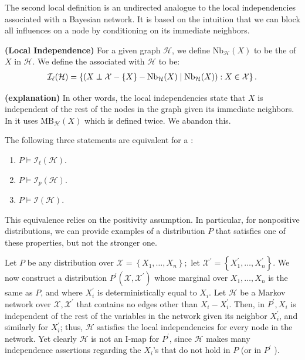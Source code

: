 \documentclass{article}
\newcommand{\bfs}[1]{\textbf{({#1}) }}
\begin{document}
The second local definition is an undirected analogue to the local independencies associated with a Bayesian network. It is based on the intuition that we can block all influences on a node by conditioning on its immediate neighbors.
\begin{defa}\bfs{Local Independence}
For a given graph $\mathcal{H}$, we define  $\mathrm{Nb}_{\mathcal{H}}(X)$ to be the  of $X$ in $\mathcal{H}$. We define the  associated with $\mathcal{H}$ to be:
\begin{align*}
\mathcal{I}_{\ell}(\mathcal{H})=\left\{\left(X \perp \mathcal{X}-\{X\}-\mathrm{Nb}_{\mathcal{H}}(X) \mid \mathrm{Nb}_{\mathcal{H}}(X)\right): X \in \mathcal{X}\right\} .
\end{align*}
\end{defa}
\begin{rema}\bfs{explanation}
In other words, the local independencies state that $X$ is independent of the rest of the nodes in the graph given its immediate neighbors. In \cite{koller2009probabilistic} it uses $\mathrm{MB}_{\mathcal{H}}(X)$ which is defined twice. We abandon this.
\end{rema}
\begin{thma}
The following three statements are equivalent for a :
\begin{enumerate}
    \item  $P \models \mathcal{I}_{\ell}(\mathcal{H})$.
    \item $P \models \mathcal{I}_{p}(\mathcal{H})$.
    \item $P \models \mathcal{I}(\mathcal{H})$.
\end{enumerate}
\end{thma}
This equivalence relies on the positivity assumption. In particular, for nonpositive distributions, we can provide examples of a distribution $P$ that satisfies one of these properties, but not the stronger one.
\begin{exma}
Let $P$ be any distribution over $\mathcal{X}=\left\{X_{1}, \ldots, X_{n}\right\} ;$ let $\mathcal{X}^{\prime}=\left\{X_{1}^{\prime}, \ldots, X_{n}^{\prime}\right\} .$ We now construct a distribution $P^{\prime}\left(\mathcal{X}, \mathcal{X}^{\prime}\right)$ whose marginal over $X_{1}, \ldots, X_{n}$ is the same as $P$, and where $X_{i}^{\prime}$ is deterministically equal to $X_{i}$. Let $\mathcal{H}$ be a Markov network over $\mathcal{X}, \mathcal{X}^{\prime}$ that contains no edges other than $X_{i}-X_{i}^{\prime}$. Then, in $P^{\prime}, X_{i}$ is independent of the rest of the variables in the network given its neighbor $X_{i}^{\prime}$, and similarly for $X_{i}^{\prime}$; thus, $\mathcal{H}$ satisfies the local independencies for every node in the network. Yet clearly $\mathcal{H}$ is not an I-map for $P^{\prime}$, since $\mathcal{H}$ makes many independence assertions regarding the $X_{i}$'s that do not hold in $P$ (or in $P^{\prime}$ ).
\end{exma}
\end{document}
